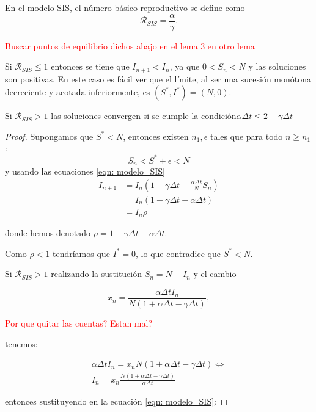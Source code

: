 En el modelo SIS, el número básico reproductivo se define como 
$$\mathcal{R}_{SIS}=\frac{\alpha}{\gamma}.$$

\textcolor{red}{Buscar puntos de equilibrio dichos abajo en el lema 3 en otro lema}

\begin{lemma}
Si $\mathcal{R}_{SIS}\leq 1$ entonces se tiene que $I_{n+1} < I_n$, ya que $0<S_n<N$ y las soluciones son positivas. En este caso es fácil ver que el límite, al ser una sucesión monótona decreciente y acotada inferiormente, es $(S^*,I^*)=(N,0)$.

Si $\mathcal{R}_{SIS}>1$ las soluciones convergen si se cumple la condición$\alpha \Delta t \leq 2+\gamma \Delta t$
\end{lemma}

\begin{proof}
Supongamos que $S^*<N$, entonces existen $n_1, \epsilon$ tales que para todo $n \geq n_1$:
$$S_n<S^*+\epsilon < N$$
y usando las ecuaciones \eqref{eqn: modelo_SIS}
\begin{equation}
\begin{aligned}
I_{n+1}  & = I_n \left( 1-\gamma \Delta t + \frac{\alpha\Delta t}{N} S_n \right) \\
& = I_n \left( 1-\gamma \Delta t + \alpha\Delta t \right) \\
& = I_n \rho 
\end{aligned}
\end{equation}


donde hemos denotado $\rho = 1-\gamma \Delta t + \alpha\Delta t$.

Como $\rho < 1$ tendríamos que $I^*=0$, lo que contradice que $S^*<N$.

Si $\mathcal{R}_{SIS}>1$ realizando la sustitución $S_n=N-I_n$ y el cambio

$$x_n=\frac{\alpha \Delta t I_n}{N(1+\alpha \Delta t - \gamma \Delta t)},$$

\textcolor{red}{Por que quitar las cuentas? Estan mal?}

tenemos:

\begin{equation}
\begin{aligned}
\alpha\Delta t I_n = x_nN(1+\alpha\Delta t-\gamma\Delta t) \Leftrightarrow \\
I_n = x_n\frac{N(1+\alpha\Delta t - \gamma\Delta t)}{\alpha\Delta t}
\end{aligned}
\end{equation}

entonces sustituyendo en la ecuación \eqref{eqn: modelo_SIS}:


\end{proof}
